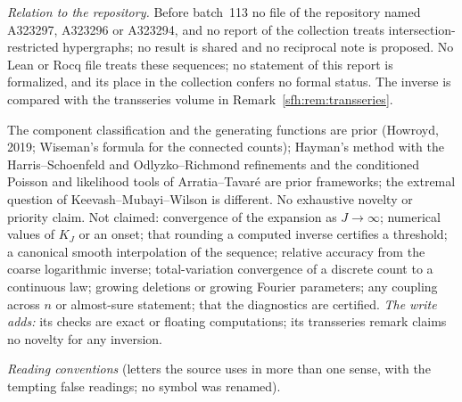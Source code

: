 \begin{writenote}
\emph{Relation to the repository.} Before batch~113 no file of the repository
named A323297, A323296 or A323294, and no report of the collection treats
intersection-restricted hypergraphs; no result is shared and no reciprocal
note is proposed. No Lean or Rocq file treats these sequences; no statement of
this report is formalized, and its place in the collection confers no formal
status. The inverse is compared with the transseries volume in
Remark~\ref{sfh:rem:transseries}.
\end{writenote}
\begin{writenote}
The component classification and the generating functions are prior
(Howroyd, 2019; Wiseman's formula for the connected counts); Hayman's method
with the Harris--Schoenfeld and Odlyzko--Richmond refinements and the
conditioned Poisson and likelihood tools of Arratia--Tavar\'e are prior
frameworks; the extremal question of Keevash--Mubayi--Wilson is different.
No exhaustive novelty or priority claim. Not claimed: convergence of the
expansion as $J\to\infty$; numerical values of $K_J$ or an onset; that
rounding a computed inverse certifies a threshold; a canonical smooth
interpolation of the sequence; relative accuracy from the coarse logarithmic
inverse; total-variation convergence of a discrete count to a continuous
law; growing deletions or growing Fourier parameters; any coupling across
$n$ or almost-sure statement; that the diagnostics are certified.
\emph{The write adds:} its checks are exact or floating computations; its
transseries remark claims no novelty for any inversion.
\end{writenote}
\medskip
\begingroup\small
\noindent\emph{Reading conventions} (letters the source uses in more than one
sense, with the tempting false readings; no symbol was renamed).\par\smallskip
\renewcommand{\arraystretch}{1.1}
